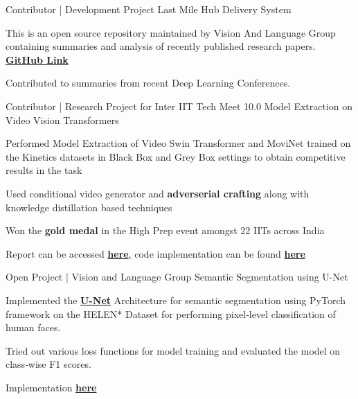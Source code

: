 
\begin{cventries}


\cventry
{Contributor | Development Project} %
{Last Mile Hub Delivery System} %
{} %
{} %
{
	\begin{cvitems} %
		\item {This is an open source repository maintained by Vision And Language Group containing summaries and analysis of recently published research papers. {\href{https://github.com/vlgiitr/papers_we_read}{\bf GitHub Link}}}
		\item {Contributed to summaries from recent Deep Learning Conferences.}
	\end{cvitems}
}


\cventry
{Contributor | Research Project for Inter IIT Tech Meet 10.0} %
{Model Extraction on Video Vision Transformers} %
{} %
{} %
{
	\begin{cvitems} %
		\item {Performed Model Extraction of Video Swin Transformer and MoviNet trained on the Kinetics datasets in Black Box and Grey Box settings to obtain competitive results in the task}
		\item {Used conditional video generator and \textbf{adverserial crafting} along with knowledge distillation based techniques}
		\item {Won the \textbf{gold medal} in the High Prep event amongst 22 IITs across India}
		\item {Report can be accessed {\href{https://github.com/dsgiitr/BOSCH-MODEL-EXTRACTION-ATTACK-FOR-VIDEO-CLASSIFICATION/blob/master/Documentation/report_final.pdf}{\bf here}}, code implementation can be found {\href{https://github.com/dsgiitr/BOSCH-MODEL-EXTRACTION-ATTACK-FOR-VIDEO-CLASSIFICATION}{\bf here}}} 
	\end{cvitems}
}


\cventry
{Open Project | Vision and Language Group} %
{Semantic Segmentation using U-Net} %
{} %
{} %
{
	\begin{cvitems} %
		\item {Implemented the \href{https://arxiv.org/pdf/1505.04597.pdf}{\bf U-Net} Architecture for semantic segmentation using PyTorch framework on the HELEN* Dataset for performing pixel‑level classification of human faces.}
	 	\item {Tried out various loss functions for model training and evaluated the model on class‑wise F1 scores.}
	 	\item Implementation \href{https://github.com/ChanBong/unet_semantic_segmentation}{\bf here}
	\end{cvitems}
}



\end{cventries}
